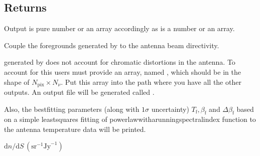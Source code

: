 \documentclass[letterpaper,10pt,english]{sphinxmanual}
\begin{document}
\begin{fulllineitems}
\begin{fulllineitems}
\subsection{Returns}
\label{\detokenize{api:id3}}\begin{description}
\sphinxAtStartPar
Output is pure number or an array accordingly as  is a number or an array.

\end{description}

\end{fulllineitems}


\begin{fulllineitems}
\label{\detokenize{api:furs.furs.couple2D}}
\pysigstartsignatures
{}
\pysigstopsignatures
\sphinxAtStartPar
Couple the foregrounds generated by {\hyperref[\detokenize{api:furs.furs.gen_freq}]{}} to the antenna beam directivity.

\sphinxAtStartPar
{} generated by {\hyperref[\detokenize{api:furs.furs.gen_freq}]{}} does not account for chromatic distortions in the antenna. To account for this users must provide an array, named , which should be in the shape of \(N_{\mathrm{pix}} \times N_{\nu}\). Put this array into the path where you have all the other outputs. An output file will be generated called .

\sphinxAtStartPar
Also, the best\sphinxhyphen{}fitting parameters (along with \(1\sigma\) uncertainty) \(T_{\mathrm{f}}, \beta_{\mathrm{f}}\) and \(\Delta\beta_{\mathrm{f}}\) based on a simple least\sphinxhyphen{}squares fitting of power\sphinxhyphen{}law\sphinxhyphen{}with\sphinxhyphen{}a\sphinxhyphen{}running\sphinxhyphen{}spectral\sphinxhyphen{}index function to the antenna temperature data will be printed.

\end{fulllineitems}


\begin{fulllineitems}
\label{\detokenize{api:furs.furs.dndS}}
\pysigstartsignatures
{}
\pysigstopsignatures
\sphinxAtStartPar
\(\mathrm{d}n/\mathrm{d}S\,(\mathrm{sr}^{-1}\mathrm{Jy}^{-1})\)


\end{fulllineitems}
\end{fulllineitems}
\end{document}

